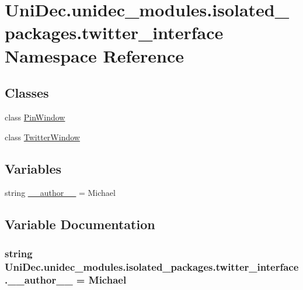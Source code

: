 \hypertarget{namespace_uni_dec_1_1unidec__modules_1_1isolated__packages_1_1twitter__interface}{}\section{Uni\+Dec.\+unidec\+\_\+modules.\+isolated\+\_\+packages.\+twitter\+\_\+interface Namespace Reference}
\label{namespace_uni_dec_1_1unidec__modules_1_1isolated__packages_1_1twitter__interface}
\subsection*{Classes}
\begin{DoxyCompactItemize}
\item 
class \hyperlink{class_uni_dec_1_1unidec__modules_1_1isolated__packages_1_1twitter__interface_1_1_pin_window}{Pin\+Window}
\item 
class \hyperlink{class_uni_dec_1_1unidec__modules_1_1isolated__packages_1_1twitter__interface_1_1_twitter_window}{Twitter\+Window}
\end{DoxyCompactItemize}
\subsection*{Variables}
\begin{DoxyCompactItemize}
\item 
string \hyperlink{namespace_uni_dec_1_1unidec__modules_1_1isolated__packages_1_1twitter__interface_a63bc5c6d513333b3847e2371bc10fb66}{\+\_\+\+\_\+author\+\_\+\+\_\+} = \textquotesingle{}Michael\textquotesingle{}
\end{DoxyCompactItemize}


\subsection{Variable Documentation}
\hypertarget{namespace_uni_dec_1_1unidec__modules_1_1isolated__packages_1_1twitter__interface_a63bc5c6d513333b3847e2371bc10fb66}{}
\subsubsection[{\+\_\+\+\_\+author\+\_\+\+\_\+}]{\setlength{\rightskip}{0pt plus 5cm}string Uni\+Dec.\+unidec\+\_\+modules.\+isolated\+\_\+packages.\+twitter\+\_\+interface.\+\_\+\+\_\+author\+\_\+\+\_\+ = \textquotesingle{}Michael\textquotesingle{}}\label{namespace_uni_dec_1_1unidec__modules_1_1isolated__packages_1_1twitter__interface_a63bc5c6d513333b3847e2371bc10fb66}
